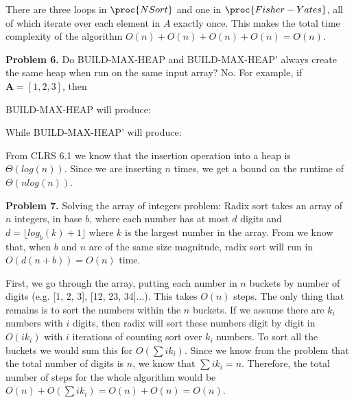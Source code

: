 \documentclass{article}
\begin{document}
There are three loops in $\proc{NSort}$ and one in $\proc{Fisher-Yates}$, all of which iterate over each element in $A$ exactly once. This makes the total time complexity of the algorithm $O(n) + O(n) + O(n) + O(n) = O(n)$.

\hfill

\textbf{Problem 6.} Do BUILD-MAX-HEAP and BUILD-MAX-HEAP' always create the same heap when run on the same input array? No. For example, if $\pmb A = [1, 2, 3]$, then

BUILD-MAX-HEAP will produce:

\begin{center}
\end{center}

While BUILD-MAX-HEAP' will produce:

\begin{center}
\end{center}

From CLRS 6.1 \cite{CLRS} we know that the insertion operation into a heap is $\Theta(log(n))$. Since we are inserting $n$ times, we get a bound on the runtime of $\Theta(nlog(n))$.

\hfill

\textbf{Problem 7.} Solving the array of integers problem: Radix sort takes an array of $n$ integers, in base $b$, where each number has at most $d$ digits and $d = \lfloor log_b(k) + 1 \rfloor$ where $k$ is the largest number in the array. From \cite{website:3} we know that, when $b$ and $n$ are of the same size magnitude, radix sort will run in $O(d(n+b)) = O(n)$ time. 

First, we go through the array, putting each number in $n$ buckets by number of digits (e.g. [1, 2, 3], [12, 23, 34]...). This takes $O(n)$ steps. The only thing that remains is to sort the numbers within the $n$ buckets. If we assume there are $k_i$ numbers with $i$ digits, then radix will sort these numbers digit by digit in $O(ik_i)$ with $i$ iterations of counting sort over $k_i$ numbers. To sort all the buckets we would sum this for $O(\sum ik_i)$. Since we know from the problem that the total number of digits is $n$, we know that $\sum ik_i = n$. Therefore, the total number of steps for the whole algorithm would be $O(n) + O(\sum ik_i) = O(n) + O(n) = O(n)$.
\end{document}
